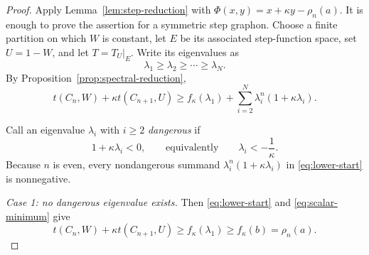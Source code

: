 \documentclass[11pt]{article}
\theoremstyle{definition}
\theoremstyle{remark}
\begin{document}
\begin{proof}
  Apply Lemma~\ref{lem:step-reduction} with
  $\Phi(x,y)=x+\kappa y-\rho_n(a)$.  It is enough to prove the assertion for a
  symmetric step graphon.  Choose a finite partition on which $W$ is constant,
  let $E$ be its associated step-function space, set $U=1-W$, and let
  $T=T_U|_E$.  Write its eigenvalues as
  \[
    \lambda_1\ge\lambda_2\ge\cdots\ge\lambda_N.
  \]
  By Proposition~\ref{prop:spectral-reduction},
  \begin{equation}
    t(C_n,W)+\kappa t(C_{n+1},U)
    \ge
    f_\kappa(\lambda_1)
    +
    \sum_{i=2}^N\lambda_i^n(1+\kappa\lambda_i).
    \label{eq:lower-start}
  \end{equation}

  Call an eigenvalue $\lambda_i$ with $i\ge2$ \emph{dangerous} if
  \begin{equation}
    1+\kappa\lambda_i<0,
    \qquad\text{equivalently}\qquad
    \lambda_i<-\frac1\kappa.
    \label{eq:dangerous-definition}
  \end{equation}
  Because $n$ is even, every nondangerous summand
  $\lambda_i^n(1+\kappa\lambda_i)$ in \eqref{eq:lower-start} is nonnegative.

  \medskip
  \noindent\emph{Case 1: no dangerous eigenvalue exists.}
  Then \eqref{eq:lower-start} and \eqref{eq:scalar-minimum} give
  \[
    t(C_n,W)+\kappa t(C_{n+1},U)
    \ge f_\kappa(\lambda_1)
    \ge f_\kappa(b)
    =\rho_n(a).
  \]


\end{proof}
\end{document}
